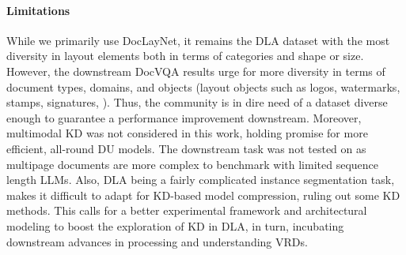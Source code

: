 \documentclass[runningheads]{llncs}
\begin{document}
\paragraph{Limitations}
While we primarily use DocLayNet, it remains the DLA dataset with the most diversity in layout elements both in terms of categories and shape or size. However, the downstream DocVQA results urge for more diversity in terms of document types, domains, and objects (\eg layout objects such as logos, watermarks, stamps, signatures, \etc). Thus, the community is in dire need of a dataset diverse enough to guarantee a performance improvement downstream. Moreover, multimodal KD was not considered in this work, holding promise for more efficient, all-round DU models.
The downstream task was not tested on \cite{VanLandeghem2023dude} as multipage documents are more complex to benchmark with limited sequence length LLMs.
Also, DLA being a fairly complicated instance segmentation task, makes it difficult to adapt for KD-based model compression, ruling out some KD methods. This calls for a better experimental framework and architectural modeling to boost the exploration of KD in DLA, in turn, incubating downstream advances in processing and understanding VRDs.

{\small
  
  
}



\end{document}
